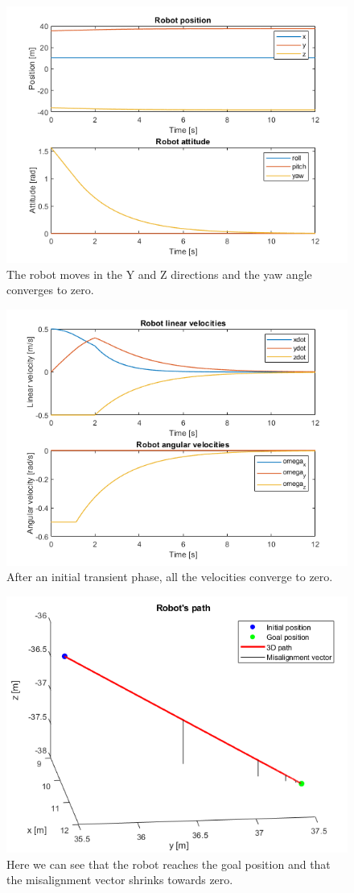 \documentclass{article}
\begin{document}
\begin{figure}[H]
	\centering
	\includegraphics[width=0.7\linewidth]{images/Ex1/HorAtt_Disabled_SameStartpos_SameEndpos_PosAndAtt}
	\caption{The robot moves in the Y and Z directions and the yaw angle converges to zero.}
	\label{fig:q2case1a}
\end{figure}
\begin{figure}[H]
	\centering
	\includegraphics[width=0.7\linewidth]{images/Ex1/HorAtt_Disabled_SameStartpos_SameEndpos_LinAngVelocities}
	\caption{After an initial transient phase, all the velocities converge to zero.}
	\label{fig:q2case1b}
\end{figure}

\begin{figure}[H]
	\centering
	\includegraphics[width=0.7\linewidth]{images/Ex1/HorAtt_Disabled_SameStartpos_SameEndpos_Path}
	\caption{Here we can see that the robot reaches the goal position and that the misalignment vector shrinks towards zero.}
	\label{fig:q2case1c}
\end{figure}
\end{document}
